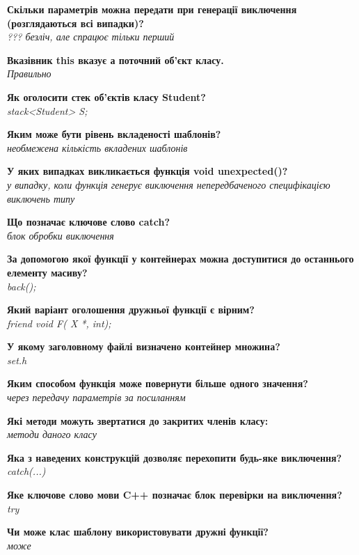 \documentclass{article}
\begin{document}
\begin{list}{}{}
	\item \textbf{Скільки параметрів можна передати при генерації виключення (розглядаються всі випадки)?} \\ \textit{??? безліч, але спрацює тільки перший}
	\item \textbf{Вказівник this вказує а поточний об'єкт класу.} \\ \textit{Правильно}
	\item \textbf{Як оголосити стек об'єктів класу Student?} \\ \textit{stack<Student> S;}
	\item \textbf{Яким може бути рівень вкладеності шаблонів?} \\ \textit{необмежена кількість вкладених шаблонів}
	\item \textbf{У яких випадках викликається функція void unexpected()?} \\ \textit{у випадку, коли функція генерує виключення непередбаченого специфікацією виключень типу}
	\item \textbf{Що позначає ключове слово catch?} \\ \textit{блок обробки виключення}
	\item \textbf{За допомогою якої функції у контейнерах можна доступитися до останнього елементу масиву?} \\ \textit{back();}
	\item \textbf{Який варіант оголошення дружньої функції є вірним?} \\ \textit{friend void F( X *, int);}
	\item \textbf{У якому заголовному файлі визначено контейнер множина?} \\ \textit{set.h}
	\item \textbf{Яким способом функція може повернути більше одного значення?} \\ \textit{через передачу параметрів за посиланням}
	\item \textbf{Які методи можуть звертатися до закритих членів класу:} \\ \textit{методи даного класу}
	\item \textbf{Яка з наведених конструкцій дозволяє перехопити будь-яке виключення?} \\ \textit{catch(...)}
	\item \textbf{Яке ключове слово мови C++ позначає блок перевірки на виключення?} \\ \textit{try}
	\item \textbf{Чи може клас шаблону використовувати дружні функції?} \\ \textit{може}

\end{list}
\end{document}
